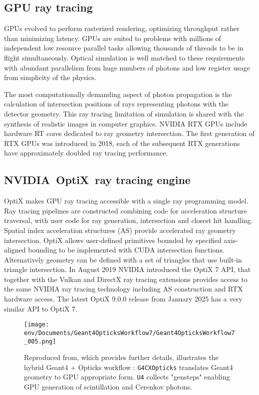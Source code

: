 \documentclass{webofc}
\begin{document}
\subsection{GPU ray tracing}%
%
GPUs evolved to perform rasterized rendering, optimizing throughput\cite{throughput} rather than minimizing latency.
GPUs are suited to problems with millions of independent low resource parallel tasks allowing thousands of threads 
to be in flight simultaneously.
Optical simulation is well matched to these requirements with abundant parallelism 
from huge numbers of photons and low register usage from simplicity of the physics.

The most computationally demanding aspect of photon propagation
is the calculation of intersection positions of rays representing photons with the detector geometry.
This ray tracing limitation of simulation is shared with the synthesis of realistic images in computer graphics. 
NVIDIA RTX\cite{rtx} GPUs include hardware RT cores dedicated to ray geometry intersection. 
The first generation of RTX GPUs was introduced in 2018, each of the subsequent RTX generations have 
approximately doubled ray tracing performance.  
%
%
\subsection{NVIDIA\textregistered\ OptiX\texttrademark\ ray tracing engine}
%
OptiX\cite{optix} makes GPU ray tracing accessible with a single ray programming model.
Ray tracing pipelines are constructed combining code for acceleration structure traversal, 
with user code for ray generation, intersection and closest hit handling.
Spatial index acceleration structures (AS) provide accelerated ray geometry intersection. 
%
OptiX allows user-defined primitives bounded by specified axis-aligned bounding
to be implemented with CUDA intersection functions. Alternatively geometry can be 
defined with a set of triangles that use built-in triangle intersection.  
%
In August 2019 NVIDIA introduced the OptiX 7 API,
that together with the Vulkan and DirectX ray tracing extensions provides access 
to the same NVIDIA ray tracing technology including AS construction and RTX hardware access. 
The latest OptiX 9.0.0 release from January 2025 has a very similar API to OptiX 7.   
%
%
\begin{figure}[t]
\centering
\texttt{[image: env/Documents/Geant4OpticksWorkflow7/Geant4OpticksWorkflow7\_005.png]}
\caption{Reproduced from\cite{chep2023}, which provides further details, illustrates the
hybrid Geant4 + Opticks workflow : {\tt G4CXOpticks} translates Geant4 geometry to GPU appropriate form. 
{\tt U4} collects "gensteps" enabling GPU generation of scintillation and Cerenkov photons. 
}
\label{workflow} 
\vspace{-5mm}
\end{figure}
%
\end{document}
